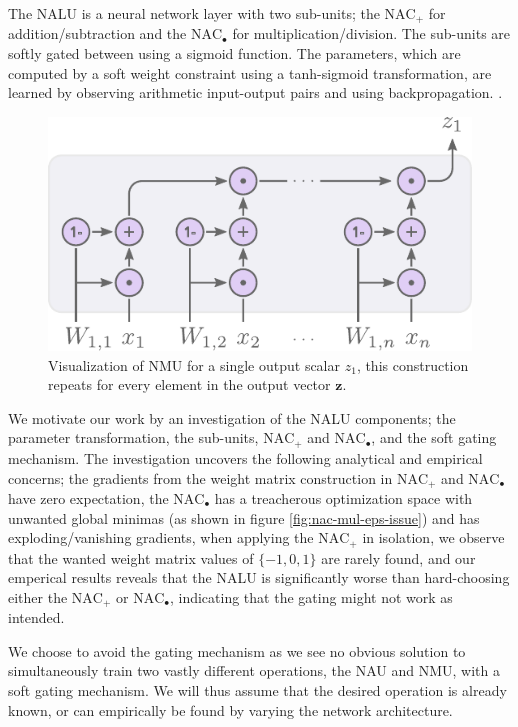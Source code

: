 The NALU is a neural network layer with two sub-units; the $\text{NAC}_{+}$ for addition/subtraction and the $\text{NAC}_{\bullet}$ for multiplication/division.
The sub-units are softly gated between using a sigmoid function. The parameters, which are computed by a soft weight constraint using a tanh-sigmoid transformation, are learned by observing arithmetic input-output pairs and using backpropagation. \cite{rumelhart1986learning}.
\begin{figure}[h]
\centering
\includegraphics[scale=0.6]{graphics/nmu.pdf}
\caption{Visualization of NMU for a single output scalar $z_1$, this construction repeats for every element in the output vector $\mathbf{z}$.}
\end{figure}
We motivate our work by an investigation of the NALU components; the parameter transformation, the sub-units, $\text{NAC}_{+}$ and $\text{NAC}_{\bullet}$, and the soft gating mechanism.
The investigation uncovers the following analytical and empirical concerns; the gradients from the weight matrix construction in $\text{NAC}_{+}$ and $\text{NAC}_{\bullet}$ have zero expectation, the $\text{NAC}_{\bullet}$ has a treacherous optimization space with unwanted global minimas (as shown in figure \ref{fig:nac-mul-eps-issue}) and has exploding/vanishing gradients, when applying the $\text{NAC}_{+}$ in isolation, we observe that the wanted weight matrix values of $\{-1, 0, 1\}$ are rarely found, and our emperical results reveals that the NALU is significantly worse than hard-choosing either the $\text{NAC}_{+}$ or $\text{NAC}_{\bullet}$, indicating that the gating might not work as intended.

We choose to avoid the gating mechanism as we see no obvious solution to simultaneously train two vastly different operations, the NAU and NMU, with a soft gating mechanism.
We will thus assume that the desired operation is already known, or can empirically be found by varying the network architecture.

